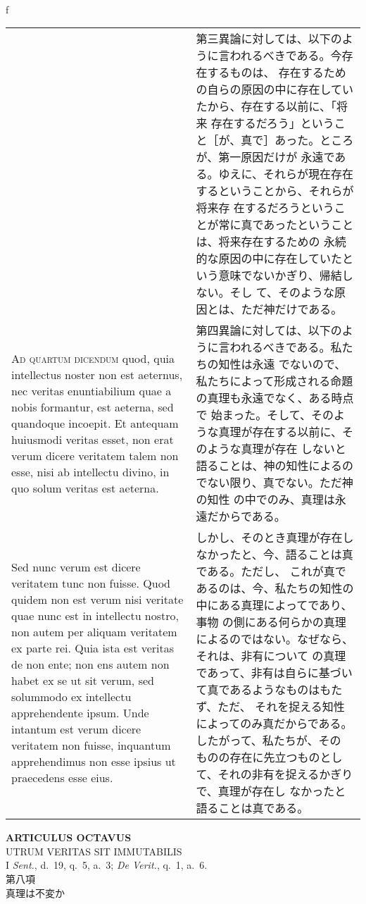 \\f\documentclass[10pt]{jsarticle} %
\begin{document}
\begin{longtable}{p{21em}p{21em}}
&

第三異論に対しては、以下のように言われるべきである。今存在するものは、
存在するための自らの原因の中に存在していたから、存在する以前に、「将来
存在するだろう」ということ［が、真で］あった。ところが、第一原因だけが
永遠である。ゆえに、それらが現在存在するということから、それらが将来存
在するだろうということが常に真であったということは、将来存在するための
永続的な原因の中に存在していたという意味でないかぎり、帰結しない。そし
て、そのような原因とは、ただ神だけである。

\\



{\scshape Ad quartum dicendum} quod, quia intellectus noster non est
aeternus, nec veritas enuntiabilium quae a nobis formantur, est
aeterna, sed quandoque incoepit. Et antequam huiusmodi veritas esset,
non erat verum dicere veritatem talem non esse, nisi ab intellectu
divino, in quo solum veritas est aeterna.

&

第四異論に対しては、以下のように言われるべきである。私たちの知性は永遠
でないので、私たちによって形成される命題の真理も永遠でなく、ある時点で
始まった。そして、そのような真理が存在する以前に、そのような真理が存在
しないと語ることは、神の知性によるのでない限り、真でない。ただ神の知性
の中でのみ、真理は永遠だからである。

\\

Sed nunc verum est dicere veritatem tunc non fuisse. Quod quidem non
est verum nisi veritate quae nunc est in intellectu nostro, non autem
per aliquam veritatem ex parte rei. Quia ista est veritas de non ente;
non ens autem non habet ex se ut sit verum, sed solummodo ex
intellectu apprehendente ipsum. Unde intantum est verum dicere
veritatem non fuisse, inquantum apprehendimus non esse ipsius ut
praecedens esse eius.

&

しかし、そのとき真理が存在しなかったと、今、語ることは真である。ただし、
これが真であるのは、今、私たちの知性の中にある真理によってであり、事物
の側にある何らかの真理によるのではない。なぜなら、それは、非有について
の真理であって、非有は自らに基づいて真であるようなものはもたず、ただ、
それを捉える知性によってのみ真だからである。したがって、私たちが、その
ものの存在に先立つものとして、それの非有を捉えるかぎりで、真理が存在し
なかったと語ることは真である。
\end{longtable}
\newpage

\begin{center}
 {\Large {\bf ARTICULUS OCTAVUS}}\\
 {\large UTRUM VERITAS SIT IMMUTABILIS}\\
 {\footnotesize I {\itshape Sent.}, d.~19, q.~5, a.~3; {\itshape De
 Verit.}, q.~1, a.~6.}\\
 {\Large 第八項\\真理は不変か}
\end{center}
\end{document}
